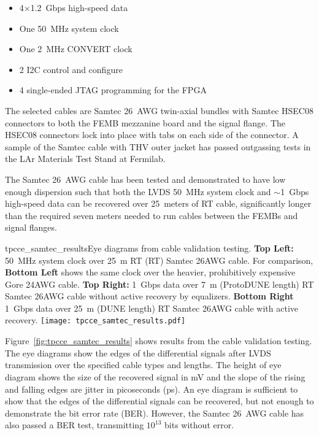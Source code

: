 \begin{itemize}
    \item 4$\times$1.2~Gbps high-speed data
    \item One 50~MHz system clock
    \item One 2~MHz CONVERT clock
    \item 2 I2C control and configure
    \item 4 single-ended JTAG programming for the FPGA
\end{itemize}



The selected cables are Samtec 26~AWG twin-axial bundles with Samtec HSEC08 connectors to both
the FEMB mezzanine board and the signal flange. 
The HSEC08
connectors lock into place with tabs on each side of the connector. A sample of the Samtec cable with
THV outer jacket has passed outgassing tests in the LAr Materials Test Stand at Fermilab.

The Samtec 26~AWG cable has been
tested and demonstrated to have low enough dispersion such that both the LVDS 50~MHz system clock and
$\sim$1~Gbps high-speed data can be recovered over 25~meters of RT cable, 
significantly longer than the required seven meters needed to run cables between the FEMBs and signal flanges.

\begin{cdrfigure}{tpcce_samtec_results}{Eye diagrams 
from cable validation testing. {\bf Top Left:} 50~MHz system clock over 25~m RT  
(RT) Samtec 26AWG cable. For comparison, {\bf Bottom Left} shows the same clock over 
the heavier, prohibitively expensive Gore 24AWG cable. {\bf Top Right:} 1~Gbps data over 
7~m (ProtoDUNE length) RT Samtec 26AWG cable without active recovery by equalizers. {\bf Bottom Right} 1~Gbps
data over 25~m (DUNE length) RT Samtec 26AWG cable with active recovery.}
\texttt{[image: tpcce\_samtec\_results.pdf]}
\end{cdrfigure}

Figure~\ref{fig:tpcce_samtec_results} shows results from the cable 
validation testing. The eye diagrams show the edges of the differential signals after 
LVDS transmission over the specified cable types and lengths. The height of eye diagram shows the size 
of the recovered signal in mV and the slope of the rising and falling edges are jitter in picoseconds (ps). 
An eye diagram is sufficient to show that the edges of the differential signals can
be recovered, but not enough to demonstrate the bit error rate (BER). However, the Samtec 26~AWG cable has 
also passed a BER test, transmitting $10^{13}$ bits without error.



